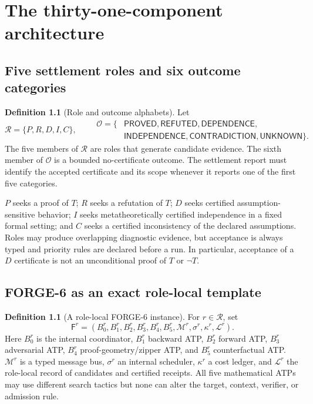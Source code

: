 \documentclass[11pt,letterpaper,oneside]{book}
\theoremstyle{definition}
\newtheorem{definition}[theorem]{Definition}
\theoremstyle{remark}
\newcommand{\Rls}{\mathcal R}
\newcommand{\F}{\mathsf F}
\begin{document}
\chapter{The thirty-one-component architecture}
\section{Five settlement roles and six outcome categories}
\begin{definition}[Role and outcome alphabets]
Let
\[
\Rls=\{P,R,D,I,C\},\qquad
\begin{aligned}
\mathcal O=\{&\mathsf{PROVED},\mathsf{REFUTED},\mathsf{DEPENDENCE},\\
&\mathsf{INDEPENDENCE},\mathsf{CONTRADICTION},\mathsf{UNKNOWN}\}.
\end{aligned}
\]
The five members of $\Rls$ are roles that generate candidate evidence. The sixth
member of $\mathcal O$ is a bounded no-certificate outcome. The settlement
report must identify the accepted certificate and its scope whenever it reports
one of the first five categories.
\end{definition}

$P$ seeks a proof of $T$; $R$ seeks a refutation of $T$; $D$ seeks certified
assumption-sensitive behavior; $I$ seeks metatheoretically certified
independence in a fixed formal setting; and $C$ seeks a certified inconsistency
of the declared assumptions. Roles may produce overlapping diagnostic evidence,
but acceptance is always typed and priority rules are declared before a run.
In particular, acceptance of a $D$ certificate is not an unconditional proof
of $T$ or $\neg T$.

\section{FORGE-6 as an exact role-local template}
\begin{definition}[A role-local FORGE-6 instance]
For $r\in\Rls$, set
\[
\F^r=(B_0^r,B_1^r,B_2^r,B_3^r,B_4^r,B_5^r,
\mathcal M^r,\sigma^r,\kappa^r,\mathcal L^r).
\]
Here $B_0^r$ is the internal coordinator, $B_1^r$ backward ATP,
$B_2^r$ forward ATP, $B_3^r$ adversarial ATP, $B_4^r$ proof-geometry/zipper
ATP, and $B_5^r$ counterfactual ATP. $\mathcal M^r$ is a typed message
bus, $\sigma^r$ an internal scheduler, $\kappa^r$ a cost ledger, and
$\mathcal L^r$ the role-local record of candidates and certified receipts.
All five mathematical ATPs may use different search tactics but none can
alter the target, context, verifier, or admission rule.
\end{definition}
\end{document}
